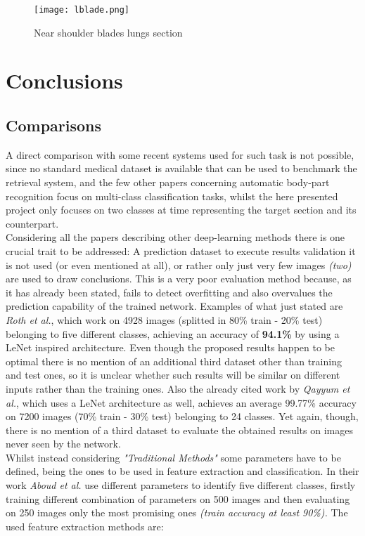 \documentclass[../main.tex]{subfiles}
\begin{document}
\vspace*{5mm}
\begin{figure}[h!b]
	\centering
	\texttt{[image: lblade.png]}
	\caption{Near shoulder blades lungs section}
	\label{fig:lungblade}
\end{figure}

\section{Conclusions}

\subsection{Comparisons}
A direct comparison with some recent systems used for such task is not possible, since no standard medical dataset is available that can be used to benchmark the retrieval system,\cite{Qayyum2017} and the few other papers concerning automatic body-part recognition focus on multi-class classification tasks, whilst the here presented project only focuses on two classes at time representing the target section and its counterpart.\\
Considering all the papers describing other deep-learning methods there is one crucial trait to be addressed: A prediction dataset to execute results validation it is not used (or even mentioned at all)\cite{Qayyum2017}, or rather only just very few images \textit{(two)} are used to draw conclusions\cite{Lakhani2018}. This is a very poor evaluation method because, as it has already been stated, fails to detect overfitting and also overvalues the prediction capability of the trained network. Examples of what just stated are \textit{Roth et al.}, which work on 4928 images (splitted in 80\% train - 20\% test) belonging to five different classes, achieving an accuracy of \textbf{94.1\%} by using a LeNet inspired architecture.\cite{Roth2015} Even though the proposed results happen to be optimal there is no mention of an additional third dataset other than training and test ones, so it is unclear whether such results will be similar on different inputs rather than the training ones. Also the already cited work by \textit{Qayyum et al.}, which uses a LeNet architecture as well, achieves an average 99.77\% accuracy on 7200 images (70\% train - 30\% test) belonging to 24 classes. Yet again, though, there is no mention of a third dataset to evaluate the obtained results on images never seen by the network.\cite{Qayyum2017}\\
Whilst instead considering \textit{"Traditional Methods"} some parameters have to be defined, being the ones to be used in feature extraction and classification. In their work \textit{Aboud et al.}\cite{Aboud2015} use different parameters to identify five different classes, firstly training different combination of parameters on 500 images and then evaluating on 250 images only the most promising ones \textit{(train accuracy at least 90\%).} The used feature extraction methods are:
\end{document}
